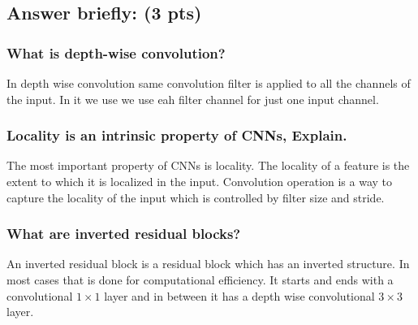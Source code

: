 \documentclass{article}
\begin{document}
\subsection{Answer briefly: (3 pts)}
\subsubsection{What is depth-wise convolution?}

In depth wise convolution same convolution filter is applied to all the channels of the input. In it we use we use eah filter channel for just one input channel.

\subsubsection{Locality is an intrinsic property of CNNs, Explain.}

The most important property of CNNs is locality. The locality of a feature is the extent to which it is localized in the input. Convolution operation is a way to capture the locality of the input which is controlled by filter size and stride.

\subsubsection{What are inverted residual blocks?}
An inverted residual block is a residual block which has an inverted structure. In most cases that is done for computational efficiency. It starts and ends with a convolutional $1\times 1$ layer and in between it has a depth wise convolutional $3\times 3$ layer.


\begin{enumerate}
\end{enumerate}
\end{document}
